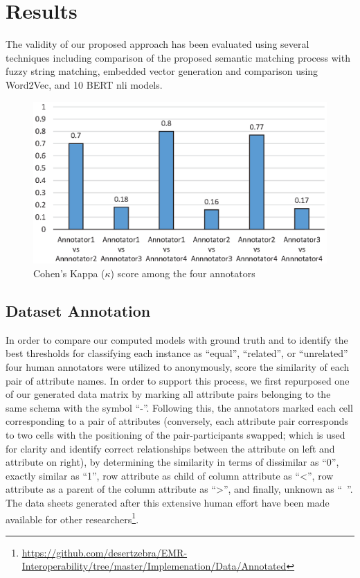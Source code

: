 \documentclass{ieeeaccess}
\begin{document}
\section{Results}
\label{results}

The validity of our proposed approach has been evaluated using several techniques including comparison of the proposed semantic matching process with fuzzy string matching, embedded vector generation and comparison using Word2Vec, and 10 BERT nli models. 

\begin{figure}[htb!]
	\centering
	\includegraphics[width=\columnwidth]{kappaInterAnnotatorAgrement}
	\caption{Cohen's Kappa ($\kappa$) score among the four annotators}
	\label{fig:kappaInterAnnotatorAgrement}
\end{figure}

\subsection{Dataset Annotation}
In order to compare our computed models with ground truth and to identify the best thresholds for classifying each instance as ``equal'', ``related'', or ``unrelated'' four human annotators were utilized to anonymously, score the similarity of each pair of attribute names. In order to support this process, we first repurposed one of our generated data matrix by marking all attribute pairs belonging to the same schema with the symbol ``-''. Following this, the annotators marked each cell corresponding to a pair of attributes (conversely, each attribute pair corresponds to two cells with the positioning of the pair-participants swapped; which is used for clarity and identify correct relationships between the attribute on left and attribute on right), by determining the similarity in terms of dissimilar as ``0'', exactly similar as ``1'', row attribute as child of column attribute as ``<'', row attribute as a parent of the column attribute as ``>'', and finally, unknown as ``~''. The data sheets generated after this extensive human effort have been made available for other researchers\footnote{\url{https://github.com/desertzebra/EMR-Interoperability/tree/master/Implemenation/Data/Annotated}}.
\end{document}
